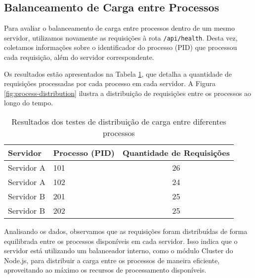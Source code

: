 \subsection{Balanceamento de Carga entre Processos}

Para avaliar o balanceamento de carga entre processos dentro de um mesmo servidor, utilizamos novamente as requisições à rota \texttt{/api/health}. Desta vez, coletamos informações sobre o identificador do processo (PID) que processou cada requisição, além do servidor correspondente.

Os resultados estão apresentados na Tabela \ref{tab:process-distribution}, que detalha a quantidade de requisições processadas por cada processo em cada servidor. A Figura \ref{fig:process-distribution} ilustra a distribuição de requisições entre os processos ao longo do tempo.

\begin{table}[H]
    \centering
    \caption{Resultados dos testes de distribuição de carga entre diferentes processos}
    \label{tab:process-distribution}
    \begin{tabular}{|l|l|c|}
        \hline
        \textbf{Servidor} & \textbf{Processo (PID)} & \textbf{Quantidade de Requisições} \\ \hline
        Servidor A            & 101                 & 26                                 \\ \hline
        Servidor A            & 102                 & 24                                 \\ \hline
        Servidor B    & 201                 & 25                                 \\ \hline
        Servidor B    & 202                 & 25                                 \\ \hline
    \end{tabular}
\end{table}


Analisando os dados, observamos que as requisições foram distribuídas de forma equilibrada entre os processos disponíveis em cada servidor. Isso indica que o servidor está utilizando um balanceador interno, como o módulo Cluster do Node.js, para distribuir a carga entre os processos de maneira eficiente, aproveitando ao máximo os recursos de processamento disponíveis.

